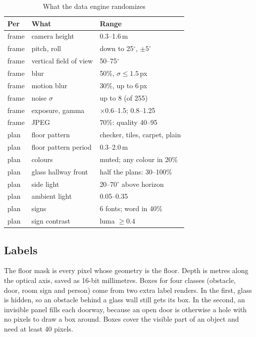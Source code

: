 \documentclass[conference]{IEEEtran}
\begin{document}
\begin{table}[t]
\caption{What the data engine randomizes}
\label{tab:randomization}
\centering
\small
\begin{tabular}{@{}lll@{}}
\toprule
Per & What & Range \\
\midrule
frame & camera height & 0.3--1.6\,m \\
frame & pitch, roll & down to 25$^\circ$, $\pm 5^\circ$ \\
frame & vertical field of view & 50--75$^\circ$ \\
frame & blur & 50\%, $\sigma \le 1.5$\,px \\
frame & motion blur & 30\%, up to 6\,px \\
frame & noise $\sigma$ & up to 8 (of 255) \\
frame & exposure, gamma & $\times$0.6--1.5; 0.8--1.25 \\
frame & JPEG & 70\%: quality 40--95 \\
plan & floor pattern & checker, tiles, carpet, plain \\
plan & floor pattern period & 0.3--2.0\,m \\
plan & colours & muted; any colour in 20\% \\
plan & glass hallway front & half the plans: 30--100\% \\
plan & side light & 20--70$^\circ$ above horizon \\
plan & ambient light & 0.05--0.35 \\
plan & signs & 6 fonts; word in 40\% \\
plan & sign contrast & luma $\ge 0.4$ \\
\bottomrule
\end{tabular}
\end{table}

\subsection{Labels}

The floor mask is every pixel whose geometry is the floor. Depth is metres
along the optical axis, saved as 16-bit millimetres. Boxes for four classes
(obstacle, door, room sign and person) come from two extra label renders. In
the first, glass is hidden, so an obstacle behind a glass wall still gets its
box. In the second, an invisible panel fills each doorway, because an open
door is otherwise a hole with no pixels to draw a box around. Boxes cover the
visible part of an object and need at least 40 pixels.
\end{document}

